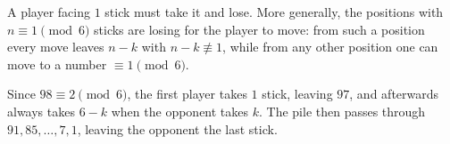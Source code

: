 A player facing $1$ stick must take it and lose. More generally, the positions with $n\equiv1\pmod6$ sticks are losing for the player to move: from such a position every move leaves $n-k$ with $n-k\not\equiv1$, while from any other position one can move to a number $\equiv1\pmod6$.

Since $98\equiv2\pmod6$, the first player takes $\boxed{1}$ stick, leaving $97$, and afterwards always takes $6-k$ when the opponent takes $k$. The pile then passes through $91,85,\dots,7,1$, leaving the opponent the last stick.

